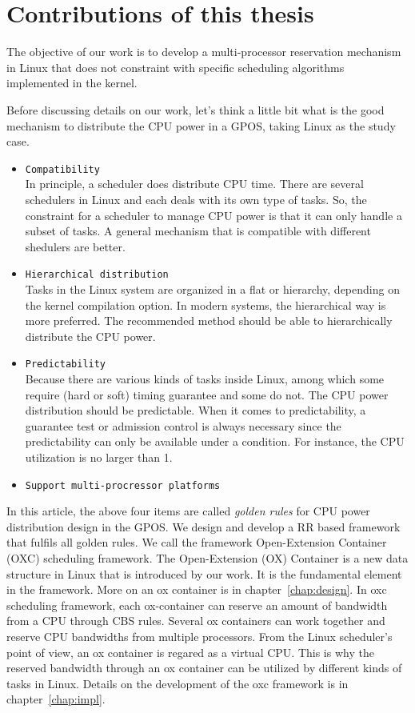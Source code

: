 \section{Contributions of this thesis}

The objective of our work is to develop a multi-processor 
reservation mechanism in Linux that does not constraint with specific 
scheduling algorithms implemented in the kernel.

%
Before discussing details on our work, let's think a little bit what
is the good mechanism to distribute the CPU power in a GPOS, taking 
Linux as the study case. 
\begin{itemize}

\item   {\texttt{Compatibility}}\\
	In principle, a scheduler does distribute CPU time. There are 
	several schedulers in Linux and each deals with its own type 
	of tasks. So, the constraint for a scheduler to manage CPU 
	power is that it can only handle a subset of tasks. A general 
	mechanism that is compatible with different shedulers are better.  
\item 	{\texttt{Hierarchical distribution}}\\
	Tasks in the Linux system are organized in a flat or hierarchy, 
	depending on the kernel compilation option. In modern systems, the 
	hierarchical way is more preferred. The recommended method should 
	be able to hierarchically distribute the CPU power.
\item 	{\texttt{Predictability}}\\
	Because there are various kinds of tasks inside Linux, among which
	some require (hard or soft) timing guarantee and some do not. 
	The CPU power distribution should be predictable. When it comes to 
	predictability, a guarantee test or admission control is always 
	necessary since the predictability can only be available under 
	a condition. For instance, the CPU utilization is no larger than 1. 
\item	{\texttt{Support multi-procressor platforms}}
\end{itemize}
In this article, the above four items are called \emph{golden rules} 
for CPU power distribution design in the GPOS. We design and develop 
a RR based framework that fulfils all golden rules. 
We call the framework Open-Extension Container (OXC) scheduling
framework. The Open-Extension (OX) Container is a new data structure in
Linux that is introduced by our work.  It is the fundamental element
in the framework. More on an ox container is in chapter~\ref{chap:design}. 
In oxc scheduling framework, each ox-container can reserve an amount of 
bandwidth from a CPU through CBS rules. Several ox containers can work
together and reserve CPU bandwidths from multiple processors. From the 
Linux scheduler's point of view, an ox container is regared as a virtual 
CPU. This is why the reserved bandwidth through an ox container can be 
utilized by different kinds of tasks in Linux. Details on the development 
of the oxc framework is in chapter~\ref{chap:impl}.

